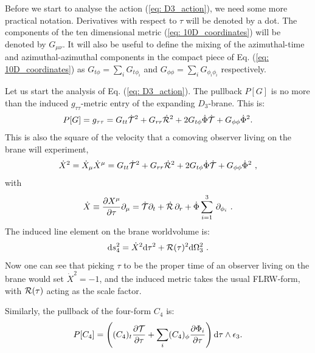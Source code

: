 Before we start to analyse the action (\ref{eq: D3_action}), we need some more practical notation. Derivatives with respect to $\tau$ will be denoted by a dot. The components of the ten dimensional metric (\ref{eq: 10D_coordinates}) will be denoted by $G_{\mu\nu}$. It will also be useful to define the mixing of the azimuthal-time and azimuthal-azimuthal components in the compact piece of Eq. (\ref{eq: 10D_coordinates}) as $G_{t\phi}=\sum_i G_{t\phi_i}$ and $G_{\phi\phi}=\sum_i G_{\phi_i\phi_i}$ respectively.

Let us start the analysis of Eq. (\ref{eq: D3_action}). The pullback $P[G]$ is no more than the induced $g_{\tau\tau}$-metric entry of the expanding $D_{3}$-brane. This is:
\begin{equation}\label{eq: pullback_G}
    P[G] = g_{\tau\tau} = G_{tt} \dot {\mathcal{T}}^2 + G_{rr} \dot {\mathcal{R}}^2 + 2G_{t\phi} \dot \Phi \dot {\mathcal{T}} + G_{\phi\phi} \dot\Phi^2.
\end{equation}
This is also the square of the velocity that a comoving observer living on the brane will experiment,
\begin{equation}\label{eq: 10velocity}
 \dot X^2 = \dot X_\mu \dot X^\mu = G_{tt} \dot {\mathcal{T}}^2 + G_{rr} \dot {\mathcal{R}}^2 + 2G_{t\phi} \dot \Phi \dot {\mathcal{T}} + G_{\phi\phi} \dot\Phi^2 \ ,
\end{equation}
with
\begin{equation}
    \dot X \equiv \frac{\partial X^\mu}{\partial\tau}\partial_\mu = \dot {\mathcal{T}} \partial_t + \dot {\mathcal{R}}\, \partial_r + \dot \Phi\sum_{i=1}^{3} \,\partial_{\phi_i} \ .
    \end{equation}
The induced line element on the brane worldvolume is:
\begin{equation}
 \text{d} s^2_4 = \dot X^2 \text{d} \tau^2 + \mathcal{R}(\tau)^2 \text{d} \Omega_{3}^2 \ .
\end{equation}
Now one can see that picking $\tau$ to be the proper time of an observer living on the brane would set $\dot{X}^2=-1$, and the induced metric takes the usual FLRW-form, with $\mathcal{R}(\tau)$ acting as the scale factor.

Similarly, the pullback of the four-form $C_{4}$ is:
\begin{equation}\label{eq: pullback_C4}
    P[C_{4}] = \left((C_{4})_{t} \frac{\partial \mathcal{T}}{\partial\tau} + \sum_{i} (C_{4})_{\phi} \frac{\partial \Phi_{i}}{\partial\tau}\right)\text{d} \tau \wedge \epsilon_{3}.
\end{equation}

